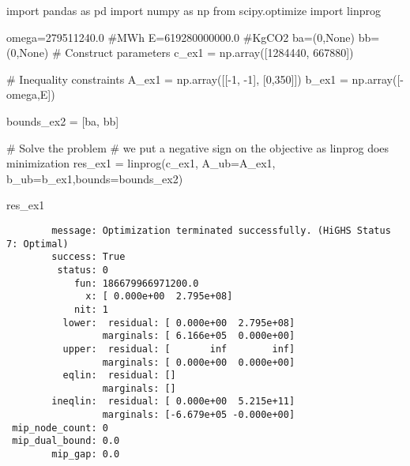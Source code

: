 \documentclass[
  a4paper,
  DIV=11,
  numbers=noendperiod]{scrartcl}
\newenvironment{Shaded}{\begin{snugshade}}{\end{snugshade}}
\newcommand{\CommentTok}[1]{\textcolor[rgb]{0.37,0.37,0.37}{#1}}
\newcommand{\DecValTok}[1]{\textcolor[rgb]{0.68,0.00,0.00}{#1}}
\newcommand{\FloatTok}[1]{\textcolor[rgb]{0.68,0.00,0.00}{#1}}
\newcommand{\ImportTok}[1]{\textcolor[rgb]{0.00,0.46,0.62}{#1}}
\newcommand{\NormalTok}[1]{\textcolor[rgb]{0.00,0.23,0.31}{#1}}
\newcommand{\OperatorTok}[1]{\textcolor[rgb]{0.37,0.37,0.37}{#1}}
\newcommand{\VariableTok}[1]{\textcolor[rgb]{0.07,0.07,0.07}{#1}}
\begin{document}
\begin{Shaded}
\begin{Highlighting}[]
\ImportTok{import}\NormalTok{ pandas }\ImportTok{as}\NormalTok{ pd}
\ImportTok{import}\NormalTok{ numpy }\ImportTok{as}\NormalTok{ np}
\ImportTok{from}\NormalTok{ scipy.optimize }\ImportTok{import}\NormalTok{ linprog}

\NormalTok{omega}\OperatorTok{=}\FloatTok{279511240.0} \CommentTok{\#MWh}
\NormalTok{E}\OperatorTok{=}\FloatTok{619280000000.0} \CommentTok{\#KgCO2}
\NormalTok{ba}\OperatorTok{=}\NormalTok{(}\DecValTok{0}\NormalTok{,}\VariableTok{None}\NormalTok{)}
\NormalTok{bb}\OperatorTok{=}\NormalTok{(}\DecValTok{0}\NormalTok{,}\VariableTok{None}\NormalTok{)}
\CommentTok{\# Construct parameters}
\NormalTok{c\_ex1 }\OperatorTok{=}\NormalTok{ np.array([}\DecValTok{1284440}\NormalTok{, }\DecValTok{667880}\NormalTok{])}

\CommentTok{\# Inequality constraints}
\NormalTok{A\_ex1 }\OperatorTok{=}\NormalTok{ np.array([[}\OperatorTok{{-}}\DecValTok{1}\NormalTok{, }\OperatorTok{{-}}\DecValTok{1}\NormalTok{],}
\NormalTok{                  [}\DecValTok{0}\NormalTok{,}\DecValTok{350}\NormalTok{]])}
\NormalTok{b\_ex1 }\OperatorTok{=}\NormalTok{ np.array([}\OperatorTok{{-}}\NormalTok{omega,E])}

\NormalTok{bounds\_ex2 }\OperatorTok{=}\NormalTok{ [ba,}
\NormalTok{              bb]}

\CommentTok{\# Solve the problem}
\CommentTok{\# we put a negative sign on the objective as linprog does minimization}
\NormalTok{res\_ex1 }\OperatorTok{=}\NormalTok{ linprog(c\_ex1, A\_ub}\OperatorTok{=}\NormalTok{A\_ex1, b\_ub}\OperatorTok{=}\NormalTok{b\_ex1,bounds}\OperatorTok{=}\NormalTok{bounds\_ex2)}

\NormalTok{res\_ex1}
\end{Highlighting}
\end{Shaded}

\begin{verbatim}
        message: Optimization terminated successfully. (HiGHS Status 7: Optimal)
        success: True
         status: 0
            fun: 186679966971200.0
              x: [ 0.000e+00  2.795e+08]
            nit: 1
          lower:  residual: [ 0.000e+00  2.795e+08]
                 marginals: [ 6.166e+05  0.000e+00]
          upper:  residual: [       inf        inf]
                 marginals: [ 0.000e+00  0.000e+00]
          eqlin:  residual: []
                 marginals: []
        ineqlin:  residual: [ 0.000e+00  5.215e+11]
                 marginals: [-6.679e+05 -0.000e+00]
 mip_node_count: 0
 mip_dual_bound: 0.0
        mip_gap: 0.0
\end{verbatim}
\end{document}
